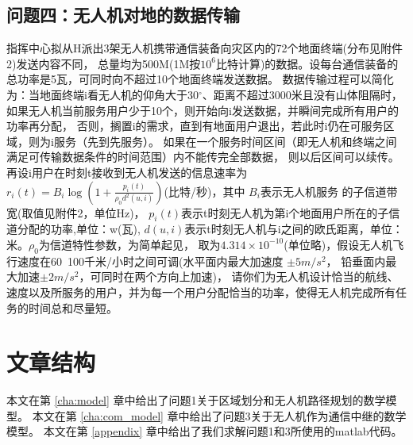 \subsection{问题四：无人机对地的数据传输}
指挥中心拟从H派出3架无人机携带通信装备向灾区内的72个地面终端(分布见附件2)发送内容不同，
总量均为500M(1M按$10^6$比特计算)的数据。设每台通信装备的总功率是5瓦，可同时向不超过10个地面终端发送数据。
数据传输过程可以简化为：当地面终端i看无人机的仰角大于30$^{\circ}$、距离不超过3000米且没有山体阻隔时，
如果无人机当前服务用户少于10个，则开始向i发送数据，并瞬间完成所有用户的功率再分配，
否则，搁置i的需求，直到有地面用户退出，若此时i仍在可服务区域，则为i服务（先到先服务）。
如果在一个服务时间区间（即无人机和终端之间满足可传输数据条件的时间范围）内不能传完全部数据，
则以后区间可以续传。再设i用户在时刻t接收到无人机发送的信息速率为
$r_i(t)=B_i \log\left(1+\frac{p_i(t)}{\rho_0 d^2(u,i)}\right)$(比特/秒)，其中
$B_i$表示无人机服务 的子信道带宽(取值见附件2，单位Hz)， 
$p_i(t)$表示t时刻无人机为第i个地面用户所在的子信道分配的功率,单位：w(瓦),
$d(u,i)$表示t时刻无人机与i之间的欧氏距离，单位：米。$\rho_0$为信道特性参数，为简单起见，
取为$4.314\times 10^{-10}$(单位略)，假设无人机飞行速度在60~100千米/小时之间可调(水平面内最大加速度 $\pm 5m/s^2$，
铅垂面内最大加速$\pm 2m/s^2$，可同时在两个方向上加速)，
请你们为无人机设计恰当的航线、速度以及所服务的用户，并为每一个用户分配恰当的功率，使得无人机完成所有任务的时间总和尽量短。
\section{文章结构}
本文在第 \ref{cha:model} 章中给出了问题1关于区域划分和无人机路径规划的数学模型。
本文在第 \ref{cha:com_model} 章中给出了问题3关于无人机作为通信中继的数学模型。
本文在第 \ref{appendix} 章中给出了我们求解问题1和3所使用的matlab代码。
